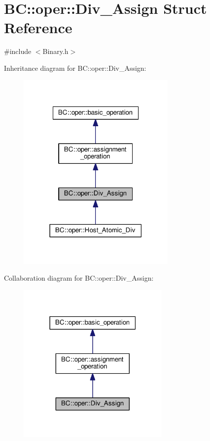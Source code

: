\hypertarget{structBC_1_1oper_1_1Div__Assign}{}\section{BC\+:\+:oper\+:\+:Div\+\_\+\+Assign Struct Reference}
\label{structBC_1_1oper_1_1Div__Assign}


{\ttfamily \#include $<$Binary.\+h$>$}



Inheritance diagram for BC\+:\+:oper\+:\+:Div\+\_\+\+Assign\+:
\nopagebreak
\begin{figure}[H]
\begin{center}
\leavevmode
\includegraphics[width=219pt]{structBC_1_1oper_1_1Div__Assign__inherit__graph}
\end{center}
\end{figure}


Collaboration diagram for BC\+:\+:oper\+:\+:Div\+\_\+\+Assign\+:
\nopagebreak
\begin{figure}[H]
\begin{center}
\leavevmode
\includegraphics[width=210pt]{structBC_1_1oper_1_1Div__Assign__coll__graph}
\end{center}
\end{figure}
